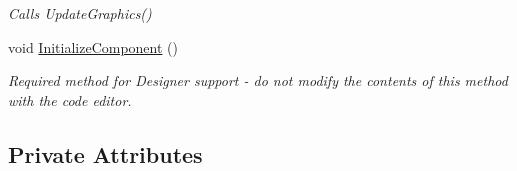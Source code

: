 \begin{DoxyCompactItemize}
\begin{DoxyCompactList}\small\item\em Calls Update\+Graphics() \end{DoxyCompactList}\item 
void \mbox{\hyperlink{class_paint___program_1_1_canvas_a34dfcf5fd2dd88431a7172cce26887ba}{Initialize\+Component}} ()
\begin{DoxyCompactList}\small\item\em Required method for Designer support -\/ do not modify the contents of this method with the code editor. \end{DoxyCompactList}\end{DoxyCompactItemize}
\subsection*{Private Attributes}

